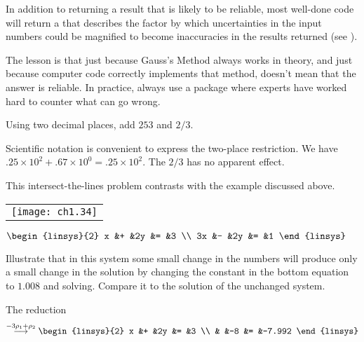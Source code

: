 In addition to returning a result that is likely to be reliable,
most well-done code will return a 
%
that describes the factor by which uncertainties in the input numbers
could be magnified to become inaccuracies in the results returned 
(see \cite{Rice}).

The lesson is that
just because Gauss's Method always works in theory, and just
because computer code correctly implements that method,
doesn't mean that the answer is reliable.
In practice, always use a package
where experts have worked hard to counter what can go wrong.

\begin{exercises}
  \item 
    Using two decimal places, add $253$ and $2/3$.
    \begin{answer}
      Scientific notation is convenient to express the two-place restriction.
      We have $.25\times 10^{2}+.67\times 10^{0}=.25\times 10^{2}$.
      The $2/3$ has no apparent effect.
    \end{answer}
  \item 
    This intersect-the-lines problem contrasts with the example
    discussed above.
    \begin{center}
      \renewcommand{\arraystretch}{1.5}
      \begin{tabular}{@{}c@{}}
        \texttt{[image: ch1.34]}
      \end{tabular}
      \qquad
      $\displaystyle \begin{linsys}{2}
            x &+ &2y &= &3  \\
            3x &- &2y &= &1
      \end{linsys}$
    \end{center}
    Illustrate that in this system 
    some small change in the numbers will produce only a
    small change in the solution by changing the constant in the
    bottom equation to $1.008$ and solving.
    Compare it to the solution of the unchanged system.
    \begin{answer}
      The reduction
      \begin{equation*}
        \grstep{-3\rho_1+\rho_2}
        \begin{linsys}{2}
          x  &+  &2y  &=  &3  \\
             &   &-8  &=  &-7.992
        \end{linsys}
      \end{equation*}

\end{answer}
\end{exercises}
